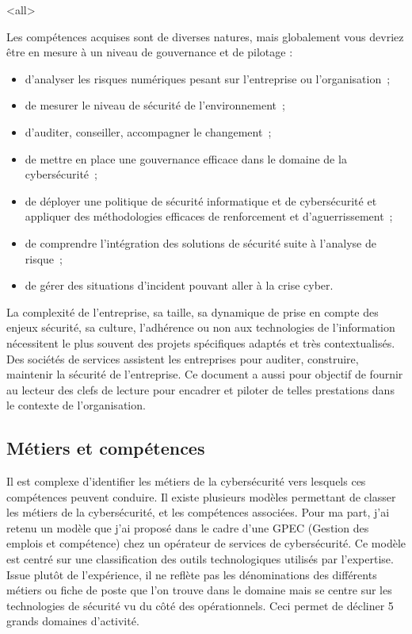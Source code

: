 \mode<all>{
{

Les compétences acquises sont de diverses natures, mais globalement vous devriez être en mesure à un niveau de gouvernance et de pilotage  :  

\begin{itemize}
	\item d'analyser les risques numériques pesant sur l'entreprise ou l'organisation ;
	\item de mesurer le niveau de sécurité de l'environnement ;
	\item d'auditer, conseiller, accompagner le changement ;
	\item de mettre en place une gouvernance efficace dans le domaine de la cybersécurité ;
	\item de déployer une politique de sécurité informatique et de cybersécurité et appliquer des méthodologies efficaces de renforcement et d'aguerrissement ;
	\item de comprendre l'intégration des solutions de sécurité suite à l'analyse de risque ;
	\item de gérer des situations d'incident pouvant aller à la crise cyber.
\end{itemize}


}} %

La complexité de l'entreprise, sa taille, sa dynamique de prise en compte des enjeux sécurité, sa culture, l'adhérence ou non aux technologies de l'information nécessitent le plus souvent des projets spécifiques adaptés et très contextualisés. Des sociétés de services assistent les entreprises pour auditer, construire, maintenir la sécurité de l'entreprise. Ce document a aussi pour objectif de fournir au lecteur des clefs de lecture pour encadrer et piloter de telles prestations dans le contexte de l'organisation. 


\subsection{Métiers et compétences } 
Il est complexe d'identifier les métiers de la cybersécurité vers lesquels ces compétences peuvent conduire. Il existe plusieurs modèles permettant de classer les métiers de la cybersécurité, et les compétences associées. Pour ma part,  j'ai retenu un modèle que j'ai proposé dans le cadre d'une GPEC (Gestion des emplois et compétence) chez un opérateur de services de cybersécurité. Ce modèle est centré sur une classification des outils technologiques utilisés par l'expertise. Issue plutôt de l'expérience, il ne reflète pas les dénominations des différents métiers ou fiche de poste que l'on trouve dans le domaine mais se centre sur les technologies de sécurité vu du côté des opérationnels. Ceci permet de décliner 5 grands domaines d'activité.

